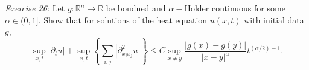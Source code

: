 \documentclass{article}
\newcommand{\exercise}[2]{
\vspace{0.2in}\begin{mdframed}[
  backgroundcolor=problem,
  skipabove=\topsep,
  skipbelow=\topsep
  ]
  \emph{Exercise {#1}:} {#2}
\end{mdframed}}
\newcommand{\R}{\mathbb{R}}
\begin{document}
      \exercise{26}{Let $g:\R^n\to \R$ be boudned and $\alpha-$Holder continuous for some $\alpha\in (0,1]$. Show that for solutions of the heat equation $u(x,t)$ with initial data $g$,
      \begin{equation}\sup_{x,t}|\partial_t u| + \sup_{x,t}\left\{\sum_{i,j}|\partial^2_{x_ix_j}u|\right\}\le C\sup_{x\ne y}\frac{|g(x)-g(y)|}{|x-y|^\alpha} t^{(\alpha/2) - 1}.\end{equation}}
\end{document}
